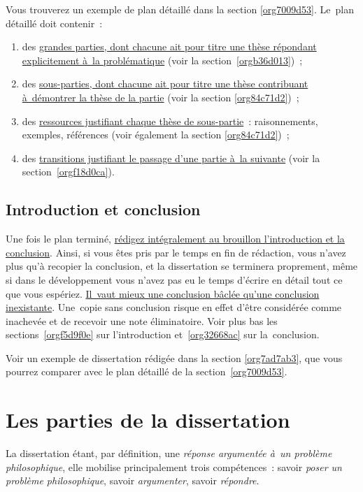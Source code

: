 \documentclass[a4paper,12pt]{report}
\begin{document}
Vous trouverez un exemple de plan détaillé dans la section \ref{org7009d53}.
Le plan détaillé doit contenir :

\begin{enumerate}
\item des \uline{grandes parties, dont chacune ait pour titre une thèse répondant
explicitement à la problématique} (voir la section \ref{orgb36d013}) ;

\item des \uline{sous-parties, dont chacune ait pour titre une thèse contribuant
à démontrer la thèse de la partie} (voir la section \ref{org84c71d2}) ;

\item des \uline{ressources justifiant chaque thèse de sous-partie} :
raisonnements, exemples, références (voir également la section
\ref{org84c71d2}) ;

\item des \uline{transitions justifiant le passage d'une partie à la suivante}
(voir la section \ref{orgf18d0ca}).
\end{enumerate}


\chapter{Introduction et conclusion}
\label{sec:org5b2e5a1}

Une fois le plan terminé, \uline{rédigez intégralement au brouillon
l'introduction et la conclusion}​. Ainsi, si vous êtes pris par le temps
en fin de rédaction, vous n'avez plus qu'à recopier la conclusion, et la
dissertation se terminera proprement, même si dans le développement vous
n'avez pas eu le temps d'écrire en détail tout ce que vous espériez.
\uline{Il vaut mieux une conclusion bâclée qu'une conclusion inexistante}.
Une copie sans conclusion risque en effet d'être considérée comme
inachevée et de recevoir une note éliminatoire. Voir plus bas les
sections \ref{orgf5d9f0e} sur l'introduction et \ref{org32668ac} sur
la conclusion.

Voir un exemple de dissertation rédigée dans la section \ref{org7ad7ab3}, que
vous pourrez comparer avec le plan détaillé de la section \ref{org7009d53}.

\part{Les parties de la dissertation}
\label{sec:org90f9ce8}

La dissertation étant, par définition, une \emph{réponse argumentée à un
problème philosophique}, elle mobilise principalement trois
compétences : savoir \emph{poser un problème philosophique}, savoir
\emph{argumenter}, savoir \emph{répondre}.
\end{document}
